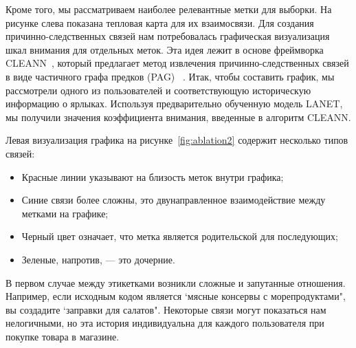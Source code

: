 \documentclass[a4paper, 12pt]{article} %
\begin{document}
Кроме того, мы рассматриваем наиболее релевантные метки для выборки. На рисунке слева показана тепловая карта для их взаимосвязи. Для создания причинно-следственных связей нам потребовалась графическая визуализация шкал внимания для отдельных меток. Эта идея лежит в основе фреймворка CLEANN~\cite{rohekar2024causal}, который предлагает метод извлечения причинно-следственных связей в виде частичного графа предков (PAG) ~\cite{richardson2002ancestral}. Итак, чтобы составить график, мы рассмотрели одного из пользователей и соответствующую историческую информацию о ярлыках. Используя предварительно обученную модель LANET, мы получили значения коэффициента внимания, введенные в алгоритм CLEANN. 

Левая визуализация графика на рисунке~\ref{fig:ablation2} содержит несколько типов связей:
\begin{itemize}  
    \item Красные линии указывают на близость меток внутри графика;
    \item Синие связи более сложны, это двунаправленное взаимодействие между метками на графике;
    \item Черный цвет означает, что метка является родительской для последующих;
    \item Зеленые, напротив, --- это дочерние.
\end{itemize} 
В первом случае между этикетками возникли сложные и запутанные отношения. Например, если исходным кодом является `мясные консервы с морепродуктами", вы создадите `заправки для салатов". Некоторые связи могут показаться нам нелогичными, но эта история индивидуальна для каждого пользователя при покупке товара в магазине. 
\end{document}
